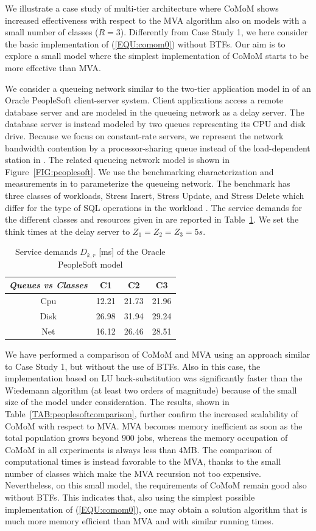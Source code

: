 \documentclass[journal,twocolumn,9.5pt]{IEEEtran}
\begin{document}
We illustrate a case study of multi-tier architecture where CoMoM shows increased effectiveness with respect to the MVA algorithm also on models with a small number of classes ($R=3$). Differently from Case Study 1, we here consider the basic implementation of (\ref{EQU:comom0}) without BTFs. Our aim is to explore a small model where the simplest implementation of CoMoM starts to be more effective than MVA.

We consider a queueing network similar to the two-tier application model in \cite{ChuAT97} of an Oracle PeopleSoft client-server system. Client applications access a remote database server and are modeled in the queueing network as a delay server. The database server is instead modeled by two queues representing its CPU and disk drive. Because we focus on constant-rate servers, we represent the network bandwidth contention by a processor-sharing queue instead of the load-dependent station in \cite{ChuAT97}. The related queueing network model is shown in Figure~\ref{FIG:peoplesoft}. We use the benchmarking characterization and measurements in \cite{ChuAT97} to parameterize the queueing network. The benchmark has three classes of workloads, {\sf Stress Insert}, {\sf Stress Update}, and {\sf Stress Delete} which differ for the type of SQL operations in the workload \cite{ChuAT97}. The service demands for the different classes and resources given in \cite{ChuAT97} are reported in Table~\ref{TAB:casestudy2}. We set the think times at the delay server to $Z_1=Z_2=Z_3=5s$.
\begin{table}[ht]
\centering
\caption{Service demands  $D_{k,r}$ [ms] of the Oracle PeopleSoft model}
\label{TAB:casestudy2}
\begin{tabular}{|c|ccc|}
\hline
\emph{\textrm{Queues} vs {\rm Classes}} & C1 &C2 &C3 \\
   \hline
Cpu & 12.21 & 21.73 & 21.96  \\
Disk & 26.98 & 31.94 & 29.24  \\
Net & 16.12 & 26.46 & 28.51 \\
\hline
\end{tabular}
\end{table}

We have performed a comparison of CoMoM and MVA using an approach similar to Case Study 1, but without the use of BTFs. Also in this case, the implementation based on LU back-substitution was significantly faster than the Wiedemann algorithm (at least two orders of magnitude) because of the small size of the model under consideration. The results, shown in Table~\ref{TAB:peoplesoftcomparison}, further confirm the increased scalability of CoMoM with respect to MVA. MVA becomes memory inefficient as soon as the total population grows beyond $900$ jobs, whereas the memory occupation of CoMoM in all experiments is always less than $4$MB. The comparison of computational times is instead favorable to the MVA, thanks to the small number of classes which make the MVA recursion not too expensive. Nevertheless, on this small model, the requirements of CoMoM remain good also without BTFs. This indicates that, also using the simplest possible implementation of (\ref{EQU:comom0}), one may obtain a solution algorithm that is much more memory efficient than MVA and with similar running times.
\end{document}
